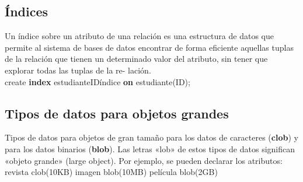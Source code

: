 \documentclass{article}
\begin{document}
\subsection{Índices}
Un índice sobre un atributo de una relación es una estructura de
datos que permite al sistema de bases de datos encontrar de forma
eficiente aquellas tuplas de la relación que tienen un determinado
valor del atributo, sin tener que explorar todas las tuplas de la re-
lación. \\
create \textbf{index} estudianteIDíndice \textbf{on} estudiante(ID);

\subsection{Tipos de datos para objetos grandes}
Tipos de datos para objetos de gran tamaño para los datos de caracteres (\textbf{clob}) y para los datos
binarios (\textbf{blob}). Las letras «lob» de estos tipos de datos significan
«objeto grande» (large object). Por ejemplo, se pueden declarar los
atributos:
revista clob(10KB)
imagen blob(10MB)
película blob(2GB)

\newpage
\end{document}
